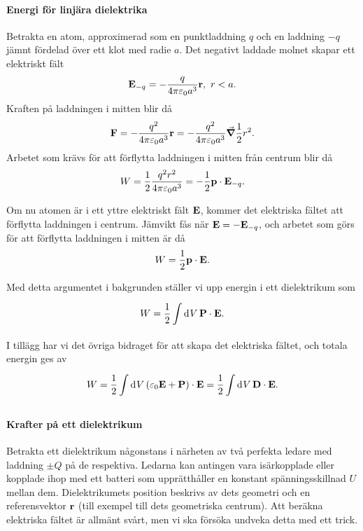 \paragraph{Energi för linjära dielektrika}
Betrakta en atom, approximerad som en punktladdning $q$ och en laddning $-q$ jämnt fördelad över ett klot med radie $a$. Det negativt laddade molnet skapar ett elektriskt fält
\begin{align*}
	\vb{E}_{-q} = -\frac{q}{4\pi\varepsilon_{0}a^{3}}\vb{r},\ r < a.
\end{align*}
Kraften på laddningen i mitten blir då
\begin{align*}
	\vb{F} = -\frac{q^{2}}{4\pi\varepsilon_{0}a^{3}}\vb{r} = -\frac{q^{2}}{4\pi\varepsilon_{0}a^{3}}\grad{\frac{1}{2}r^{2}}.
\end{align*}
Arbetet som krävs för att förflytta laddningen i mitten från centrum blir då
\begin{align*}
	W = \frac{1}{2}\frac{q^{2}r^{2}}{4\pi\varepsilon_{0}a^{3}} = -\frac{1}{2}\vb{p}\cdot\vb{E}_{-q}.
\end{align*}

Om nu atomen är i ett yttre elektriskt fält $\vb{E}$, kommer det elektriska fältet att förflytta laddningen i centrum. Jämvikt fås när $\vb{E} = -\vb{E}_{-q}$, och arbetet som görs för att förflytta laddningen i mitten är då
\begin{align*}
	W = \frac{1}{2}\vb{p}\cdot\vb{E}.
\end{align*}

Med detta argumentet i bakgrunden ställer vi upp energin i ett dielektrikum som
\begin{align*}
	W = \frac{1}{2}\int\limits_{}^{}\dd[]{V}\vb{P}\cdot\vb{E}.
\end{align*}
I tillägg har vi det övriga bidraget för att skapa det elektriska fältet, och totala energin ges av
\begin{align*}
	W = \frac{1}{2}\int\limits_{}^{}\dd[]{V}(\varepsilon_{0}\vb{E} + \vb{P})\cdot\vb{E} = \frac{1}{2}\int\limits_{}^{}\dd[]{V}\vb{D}\cdot\vb{E}.
\end{align*}

\paragraph{Krafter på ett dielektrikum}
Betrakta ett dielektrikum någonstans i närheten av två perfekta ledare med laddning $\pm Q$ på de respektiva. Ledarna kan antingen vara isärkopplade eller kopplade ihop med ett batteri som upprätthåller en konstant spänningsskillnad $U$ mellan dem. Dielektrikumets position beskrivs av dets geometri och en referensvektor $\vb{r}$ (till exempel till dets geometriska centrum). Att beräkna elektriska fältet är allmänt svårt, men vi ska försöka undveka detta med ett trick.

